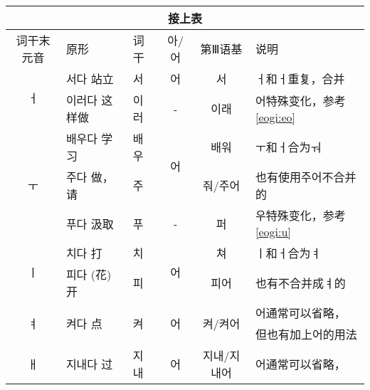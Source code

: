 \begin{tabular}{|c|l|l|c|c|l|}
	\hline
	\multicolumn{6}{|c|}{接上表}                                                                                                                \\\hline
	词干末元音              & 原形                     & 词干                  &\kr  아/어                & 第Ⅲ语基                    & 说明                    \\\hline
	\multirow{2}{*}{\kr ㅓ} & {\kr 서다} 站立                  & \kr 서                   &\kr  어                  & \kr 서                       & {\kr ㅓ}和{\kr ㅓ}重复，合并              \\\cline{2-6}
	                   & {\kr 이러다} 这样做                & \kr 이러                  & -                  & \kr 이래                      & {\kr 어}特殊变化，参考\ref{eogi:eo} \\\hline
	\multirow{3}{*}{\kr ㅜ} & {\kr 배우다} 学习                 &\kr  배우                  & \multirow{2}{*}{\kr 어} & \kr 배워                      & {\kr ㅜ}和{\kr ㅓ}合为{\kr ㅝ}                \\\cline{2-3}\cline{5-6}
	                   & {\kr 주다} 做，请                 & \kr 주                   &                    & \kr 줘/주어                    & 也有使用{\kr 주어}不合并的            \\\cline{2-6}
	                   & {\kr 푸다} 汲取                  & \kr 푸                   & -                  & \kr 퍼                       & {\kr 우}特殊变化，参考\ref{eogi:u}  \\\hline
	\multirow{2}{*}{\kr ㅣ} & {\kr 치다} 打                   &\kr  치                   & \multirow{2}{*}{\kr 어} & \kr 쳐                       &{\kr  ㅣ}和{\kr ㅓ}合为\kr ㅕ                \\\cline{2-3}\cline{5-6}
	                   & {\kr 피다} (花)开                & \kr 피                   &                    & \kr 피어                      & 也有不合并成{\kr ㅕ}的              \\\hline
	\multirow{2}{*}{\kr ㅕ} & \multirow{2}{*}{{\kr 켜다} 点}  & \multirow{2}{*}{\kr 켜}  & \multirow{2}{*}{\kr 어} & \multirow{2}{*}{\kr 켜/켜어}   &{\kr  어}通常可以省略，              \\
	                   &                        &                     &                    &                         & 但也有加上{\kr 어}的用法             \\\hline
	\multirow{2}{*}{\kr ㅐ} & \multirow{2}{*}{{\kr 지내다} 过} & \multirow{2}{*}{\kr 지내} & \multirow{2}{*}{\kr 어} & \multirow{2}{*}{\kr 지내/지내어} & {\kr  어}通常可以省略，              \\

\end{tabular}
